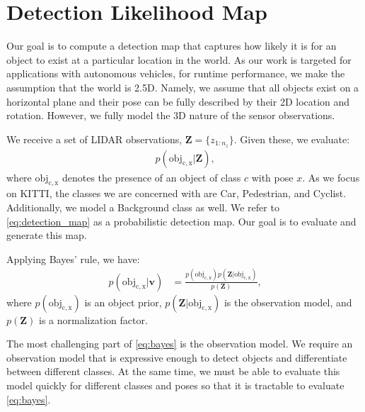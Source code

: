 \section{Detection Likelihood Map}\label{sec:dlm}

Our goal is to compute a detection map that captures how likely it is for an
object to exist at a particular location in the world. As our work is targeted
for applications with autonomous vehicles, for runtime performance, we make the
assumption that the world is 2.5D. Namely, we assume that all objects exist on a
horizontal plane and their pose can be fully described by their 2D location and
rotation. However, we fully model the 3D nature of the sensor observations.

We receive a set of \ac{LIDAR} observations, $\mathbf{Z} = \{z_{1:n_z}\}$. Given
these, we evaluate:
%
\begin{align}
  p(\mathrm{obj_{c, x}}| \mathbf{Z}) \text{,} \label{eq:detection_map}
\end{align}
%
where $\mathrm{obj_{c, x}}$ denotes the presence of an object of class $c$ with
pose $x$. As we focus on KITTI, the classes we are concerned with are Car,
Pedestrian, and Cyclist. Additionally, we model a Background class as well. We
refer to \eqref{eq:detection_map} as a probabilistic detection map. Our goal is
to evaluate and generate this map.

Applying Bayes' rule, we have:
%
\begin{align}
  p(\mathrm{obj_{c, x}} | \mathbf{v}) &=
    \frac
      {p(\mathrm{obj_{c, x}}) p(\mathbf{Z} | \mathrm{obj_{c, x}})}
      {p(\mathbf{Z})}
  \text{,}
  \label{eq:bayes}
\end{align}
%
where $p(\mathrm{obj_{c, x}})$ is an object prior,
$p(\mathbf{Z} | \mathrm{obj_{c, x}})$ is the observation model, and
$p(\mathbf{Z})$ is a normalization factor.

The most challenging part of \eqref{eq:bayes} is the observation model.
We require an observation model that is expressive enough to detect objects and
differentiate between different classes. At the same time, we must be able to
evaluate this model quickly for different classes and poses so that it is
tractable to evaluate \eqref{eq:bayes}.
